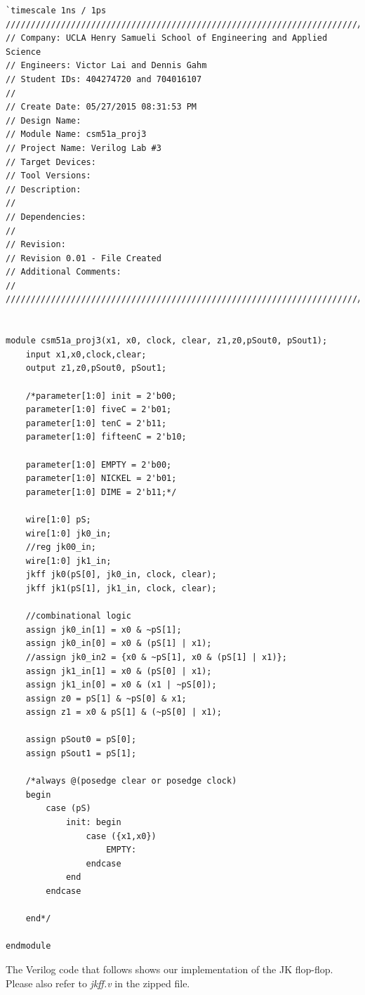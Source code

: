 \documentclass{article}
\begin{document}
\begin{verbatim}
`timescale 1ns / 1ps
/////////////////////////////////////////////////////////////////////////////
// Company: UCLA Henry Samueli School of Engineering and Applied Science
// Engineers: Victor Lai and Dennis Gahm
// Student IDs: 404274720 and 704016107
// 
// Create Date: 05/27/2015 08:31:53 PM
// Design Name: 
// Module Name: csm51a_proj3
// Project Name: Verilog Lab #3
// Target Devices: 
// Tool Versions: 
// Description: 
// 
// Dependencies: 
// 
// Revision:
// Revision 0.01 - File Created
// Additional Comments:
// 
/////////////////////////////////////////////////////////////////////////////


module csm51a_proj3(x1, x0, clock, clear, z1,z0,pSout0, pSout1);
    input x1,x0,clock,clear;
    output z1,z0,pSout0, pSout1;
    
    /*parameter[1:0] init = 2'b00;
    parameter[1:0] fiveC = 2'b01;
    parameter[1:0] tenC = 2'b11;
    parameter[1:0] fifteenC = 2'b10;
    
    parameter[1:0] EMPTY = 2'b00;
    parameter[1:0] NICKEL = 2'b01;
    parameter[1:0] DIME = 2'b11;*/
    
    wire[1:0] pS;
    wire[1:0] jk0_in;
    //reg jk00_in;
    wire[1:0] jk1_in;
    jkff jk0(pS[0], jk0_in, clock, clear);
    jkff jk1(pS[1], jk1_in, clock, clear);
    
    //combinational logic
    assign jk0_in[1] = x0 & ~pS[1];
    assign jk0_in[0] = x0 & (pS[1] | x1);
    //assign jk0_in2 = {x0 & ~pS[1], x0 & (pS[1] | x1)};
    assign jk1_in[1] = x0 & (pS[0] | x1);
    assign jk1_in[0] = x0 & (x1 | ~pS[0]);
    assign z0 = pS[1] & ~pS[0] & x1;
    assign z1 = x0 & pS[1] & (~pS[0] | x1);
    
    assign pSout0 = pS[0];
    assign pSout1 = pS[1];
    
    /*always @(posedge clear or posedge clock)
    begin
        case (pS)
            init: begin
                case ({x1,x0})
                    EMPTY: 
                endcase
            end
        endcase
        
    end*/
    
endmodule
\end{verbatim}

The Verilog code that follows shows our implementation of the JK flop-flop. 
Please also refer to \textit{jkff.v} in the zipped file.\\
\end{document}
